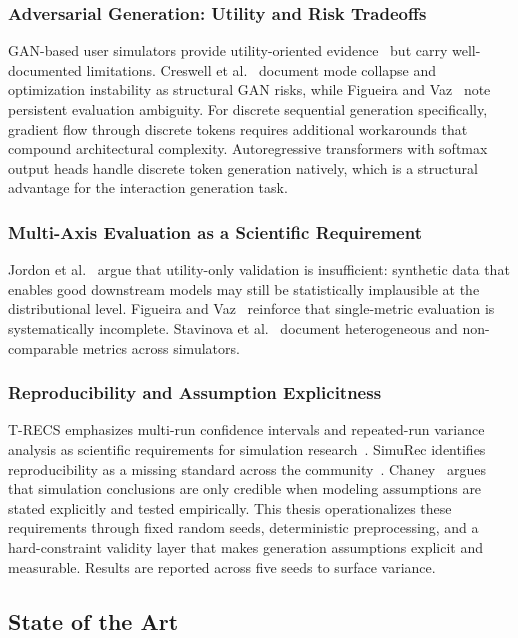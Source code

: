 \documentclass[sigconf,nonacm]{acmart}
\begin{document}
\subsubsection{Adversarial Generation: Utility and Risk Tradeoffs}
GAN-based user simulators provide utility-oriented
evidence~\cite{zhao2021usersim,bobadilla2023ganrs} but carry well-documented
limitations. Creswell et al.~\cite{creswell2018gan} document mode collapse
and optimization instability as structural GAN risks, while Figueira and
Vaz~\cite{figueira2022survey} note persistent evaluation ambiguity. For
discrete sequential generation specifically, gradient flow through discrete
tokens requires additional workarounds that compound architectural
complexity. Autoregressive transformers with softmax output heads handle
discrete token generation natively, which is a structural advantage for the
interaction generation task.

\subsubsection{Multi-Axis Evaluation as a Scientific Requirement}
Jordon et al.~\cite{jordon2022synthetic} argue that utility-only validation
is insufficient: synthetic data that enables good downstream models may still
be statistically implausible at the distributional level. Figueira and
Vaz~\cite{figueira2022survey} reinforce that single-metric evaluation is
systematically incomplete. Stavinova et al.~\cite{stavinova2022survey}
document heterogeneous and non-comparable metrics across simulators.
\subsubsection{Reproducibility and Assumption Explicitness}
T-RECS emphasizes multi-run confidence intervals and repeated-run variance
analysis as scientific requirements for simulation
research~\cite{lucherini2021trecs}. SimuRec identifies reproducibility as a
missing standard across the community~\cite{ekstrand2021simurec}.
Chaney~\cite{chaney2021challenges} argues that simulation conclusions are
only credible when modeling assumptions are stated explicitly and tested
empirically. This thesis operationalizes these requirements through fixed
random seeds, deterministic preprocessing, and a hard-constraint validity
layer that makes generation assumptions explicit and measurable. Results are
reported across five seeds to surface variance.

\subsection{State of the Art}
\label{sec:sota}
\end{document}
